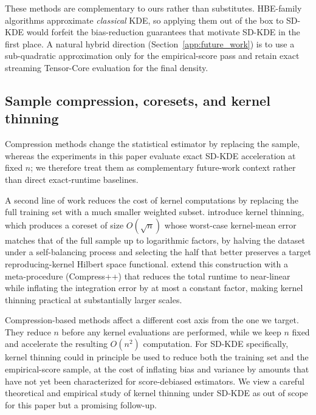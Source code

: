 These methods are complementary to ours rather than substitutes.
HBE-family algorithms approximate \emph{classical} KDE, so applying them
out of the box to SD-KDE would forfeit the bias-reduction guarantees that
motivate SD-KDE in the first place.
A natural hybrid direction (Section~\ref{app:future_work}) is to use a
sub-quadratic approximation only for the empirical-score pass and retain
exact streaming Tensor-Core evaluation for the final density.

\subsection{Sample compression, coresets, and kernel thinning}
\label{app:compression_literature}

Compression methods change the statistical estimator by replacing the sample, whereas the experiments in this paper evaluate exact SD-KDE acceleration at fixed $n$; we therefore treat them as complementary future-work context rather than direct exact-runtime baselines.

A second line of work reduces the cost of kernel computations by replacing
the full training set with a much smaller weighted subset.
\citet{dwivedi2021kernel} introduce kernel thinning, which produces a
coreset of size $O(\sqrt{n})$ whose worst-case kernel-mean error matches
that of the full sample up to logarithmic factors, by halving the dataset
under a self-balancing process and selecting the half that better
preserves a target reproducing-kernel Hilbert space functional.
\citet{shetty2022compress} extend this construction with a meta-procedure
(Compress++) that reduces the total runtime to near-linear while inflating
the integration error by at most a constant factor, making kernel thinning
practical at substantially larger scales.

Compression-based methods affect a different cost axis from the one we
target.
They reduce $n$ before any kernel evaluations are performed, while we keep
$n$ fixed and accelerate the resulting $O(n^2)$ computation.
For SD-KDE specifically, kernel thinning could in principle be used to
reduce both the training set and the empirical-score sample, at the cost
of inflating bias and variance by amounts that have not yet been
characterized for score-debiased estimators.
We view a careful theoretical and empirical study of kernel thinning under
SD-KDE as out of scope for this paper but a promising follow-up.

